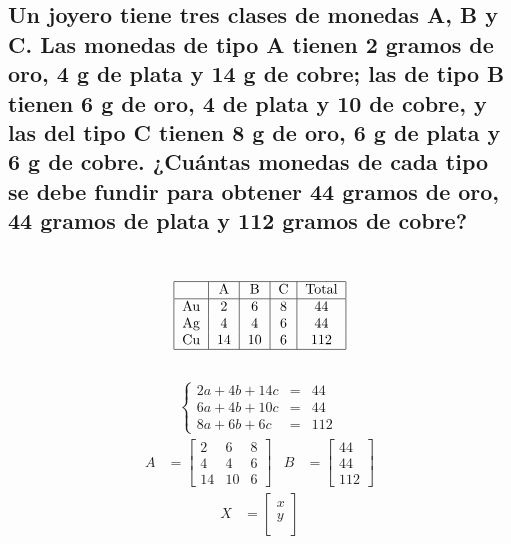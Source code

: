 \documentclass[11pt, a4paper]{article}
\begin{document}
\subsection{Un joyero tiene tres clases de monedas A, B y C. Las monedas de tipo A tienen 2 gramos de oro, 4 g de plata y 14 g de cobre;
las de tipo B tienen 6 g de oro, 4 de plata y 10 de cobre, y las del tipo C tienen 8 g de oro, 6 g de plata y 6 g de cobre. ¿Cuántas monedas de cada tipo se debe fundir para obtener 44 gramos de oro, 44 gramos de plata y 112 gramos de cobre?}
\begin{multicols}{2}
\\
\begin{align*}
  \begin{tabular}{|c|c|c|c|c|}
    \hline
    & A & B & C & Total\\
    \hline
    Au & 2 & 6 & 8 & 44\\
    Ag & 4 & 4 & 6 & 44\\
    Cu & 14 & 10 & 6 & 112\\
    \hline
  \end{tabular}
\end{align*}\\
  \begin{align*}
    \left\{
    \begin{array}{rcl}
      2a+4b+14c &= &44\\
      6a+4b+10c &= &44\\
      8a+6b+6c &= &112
    \end{array}
    \right.\
  \end{align*}
  \begin{align*}
    A &= \begin{bmatrix}
      2 & 6 & 8\\
      4 & 4 & 6\\
      14 & 10 & 6
    \end{bmatrix}&
    B &= \begin{bmatrix}
      44\\
      44\\
      112
    \end{bmatrix}
  \end{align*}
  \begin{align*}
    X &= \begin{bmatrix}
      x\\
      y\\

\end{bmatrix}
\end{align*}
\end{multicols}
\end{document}
